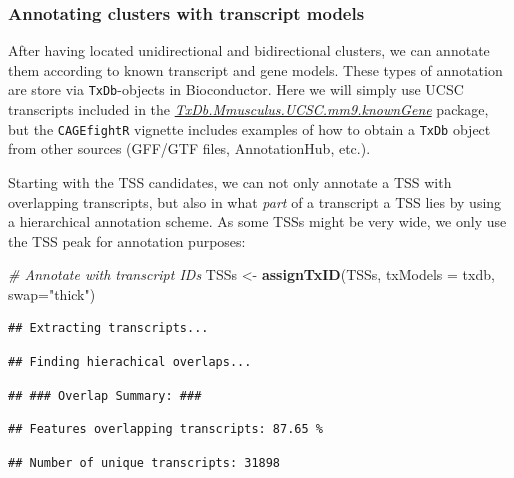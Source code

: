 \documentclass[9pt,a4paper,]{extarticle}
\newenvironment{Shaded}{\begin{snugshade}}{\end{snugshade}}
\newcommand{\KeywordTok}[1]{\textcolor[rgb]{0.13,0.29,0.53}{\textbf{{#1}}}}
\newcommand{\DataTypeTok}[1]{\textcolor[rgb]{0.13,0.29,0.53}{{#1}}}
\newcommand{\StringTok}[1]{\textcolor[rgb]{0.31,0.60,0.02}{{#1}}}
\newcommand{\CommentTok}[1]{\textcolor[rgb]{0.56,0.35,0.01}{\textit{{#1}}}}
\newcommand{\NormalTok}[1]{{#1}}
\begin{document}
\subsubsection{Annotating clusters with transcript models}\label{annotating-clusters-with-transcript-models}

After having located unidirectional and bidirectional clusters, we can annotate them according to known transcript and gene models. These types of annotation are store via \texttt{TxDb}-objects in Bioconductor. Here we will simply use UCSC transcripts included in the \emph{\href{https://bioconductor.org/packages/3.8/TxDb.Mmusculus.UCSC.mm9.knownGene}{TxDb.Mmusculus.UCSC.mm9.knownGene}} package, but the \texttt{CAGEfightR} vignette includes examples of how to obtain a \texttt{TxDb} object from other sources (GFF/GTF files, AnnotationHub, etc.).

Starting with the TSS candidates, we can not only annotate a TSS with overlapping transcripts, but also in what \emph{part} of a transcript a TSS lies by using a hierarchical annotation scheme. As some TSSs might be very wide, we only use the TSS peak for annotation purposes:

\begin{Shaded}
\begin{Highlighting}[]
\CommentTok{# Annotate with transcript IDs}
\NormalTok{TSSs <-}\StringTok{ }\KeywordTok{assignTxID}\NormalTok{(TSSs, }\DataTypeTok{txModels =} \NormalTok{txdb, }\DataTypeTok{swap=}\StringTok{"thick"}\NormalTok{)}
\end{Highlighting}
\end{Shaded}

\begin{verbatim}
## Extracting transcripts...
\end{verbatim}

\begin{verbatim}
## Finding hierachical overlaps...
\end{verbatim}

\begin{verbatim}
## ### Overlap Summary: ###
\end{verbatim}

\begin{verbatim}
## Features overlapping transcripts: 87.65 %
\end{verbatim}

\begin{verbatim}
## Number of unique transcripts: 31898
\end{verbatim}
\end{document}
